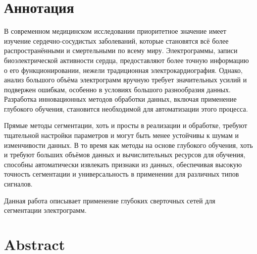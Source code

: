 \section*{Аннотация}

В современном медицинском исследовании приоритетное значение имеет изучение
сердечно-сосудистых заболеваний, которые становятся всё более распространёнными
и смертельными по всему миру. Электрограммы, записи биоэлектрической активности
сердца, предоставляют более точную информацию о его функционировании, нежели
традиционная электрокардиография. Однако, анализ большого объёма электрограмм
вручную требует значительных усилий и подвержен ошибкам, особенно в условиях
большого разнообразия данных. Разработка инновационных методов обработки данных,
включая применение глубокого обучения, становится необходимой для автоматизации
этого процесса.

Прямые методы сегментации, хоть и просты в реализации и обработке, требуют
тщательной настройки параметров и могут быть менее устойчивы к шумам и
изменчивости данных. В то время как методы на основе глубокого обучения, хоть и
требуют больших объёмов данных и вычислительных ресурсов для обучения, способны
автоматически извлекать признаки из данных, обеспечивая высокую точность
сегментации и универсальность в применении для различных типов сигналов.

Данная работа описывает применение глубоких сверточных сетей для сегментации
электрограмм.

\section*{Abstract}

